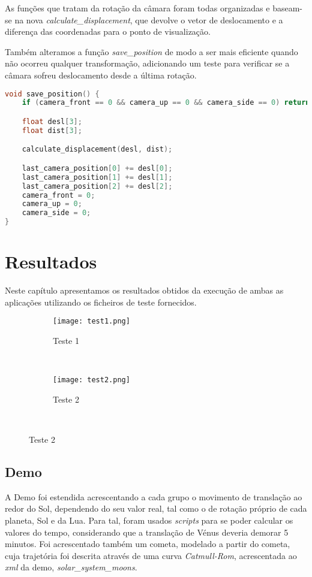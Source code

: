 \documentclass[14pt, a4 paper]{report}
\begin{document}
As funções que tratam da rotação da câmara foram todas organizadas e baseam-se na nova \textit{calculate\_displacement}, que devolve o vetor de deslocamento e a diferença das coordenadas para o ponto de visualização.

Também alteramos a função \textit{save\_position} de modo a ser mais eficiente quando não ocorreu qualquer transformação, adicionando um teste para verificar se a câmara sofreu deslocamento desde a última rotação.

\begin{lstlisting}[language = c++]
void save_position() {
	if (camera_front == 0 && camera_up == 0 && camera_side == 0) return;

	float desl[3];
	float dist[3];

	calculate_displacement(desl, dist);

	last_camera_position[0] += desl[0];
	last_camera_position[1] += desl[1];
	last_camera_position[2] += desl[2];
	camera_front = 0;
	camera_up = 0;
	camera_side = 0;
}

\end{lstlisting}

\chapter{Resultados} \label{chap:resultado}

Neste capítulo apresentamos os resultados obtidos da execução de ambas as aplicações utilizando os ficheiros de teste fornecidos.

\begin{figure}[h]
    \centering
    \begin{subfigure}{1\textwidth}
    \centering
    \texttt{[image: test1.png]}
    \caption{Teste 1}
    \label{fig:sub1}
    \end{subfigure}%
    \\
    \begin{subfigure}{1\textwidth}
    \centering
    \texttt{[image: test2.png]}
    \caption{Teste 2}
    \label{fig:sub2}
    \end{subfigure}%
    \\
    \label{fig:2}
\end{figure}

\section{Demo}

A Demo foi estendida acrescentando a cada grupo o movimento de translação ao redor do Sol, dependendo do seu valor real, tal como o de rotação próprio de cada planeta, Sol e da Lua. Para tal, foram usados \textit{scripts} para se poder calcular os valores do tempo, considerando que a translação de Vénus deveria demorar 5 minutos. Foi acrescentado também um cometa, modelado a partir do cometa, cuja trajetória foi descrita através de uma curva \textit{Catmull-Rom}, acrescentada ao \textit{xml} da demo, \textit{solar\_system\_moons}.
\end{document}
